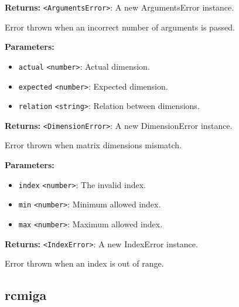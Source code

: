 \documentclass[12pt,a4paper]{article}
\begin{document}
\noindent \textbf{Returns:} \texttt{<ArgumentsError>}: A new ArgumentsError instance.

\noindent Error thrown when an incorrect number of arguments is passed.

\vspace{5mm}
\noindent {}


\noindent \textbf{Parameters:}
\begin{itemize}
  \item \texttt{actual} \texttt{<number>}: Actual dimension.
  \item \texttt{expected} \texttt{<number>}: Expected dimension.
  \item \texttt{relation} \texttt{<string>}: Relation between dimensions.
\end{itemize}

\noindent \textbf{Returns:} \texttt{<DimensionError>}: A new DimensionError instance.

\noindent Error thrown when matrix dimensions mismatch.

\vspace{5mm}
\noindent {}


\noindent \textbf{Parameters:}
\begin{itemize}
  \item \texttt{index} \texttt{<number>}: The invalid index.
  \item \texttt{min} \texttt{<number>}: Minimum allowed index.
  \item \texttt{max} \texttt{<number>}: Maximum allowed index.
\end{itemize}

\noindent \textbf{Returns:} \texttt{<IndexError>}: A new IndexError instance.

\noindent Error thrown when an index is out of range.


\subsection{rcmiga}
\vspace{5mm}
\noindent {}
\end{document}
